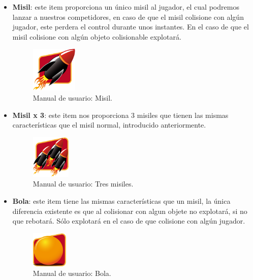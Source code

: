 \begin{itemize}
    \item \textbf{Misil}: este item proporciona un único misil al jugador, el cual podremos lanzar a nuestros competidores,
    en caso de que el misil colisione con algún jugador, este perdera el control durante unos instantes. En el caso de que el 
    misil colisione con algún objeto colisionable explotará.
        \begin{figure}[H]
          \label{misil}
          \begin{center}
            \includegraphics[scale=1]{imagenes/items/missile.png}
          \end{center}
         \caption{Manual de usuario: Misil.}
        \end{figure}
        
    \item \textbf{Misil x 3}: este item nos proporciona 3 misiles que tienen las mismas características que el misil normal, 
    introducido anteriormente.
        \begin{figure}[H]
          \label{tres_misiles}
          \begin{center}
            \includegraphics[scale=1]{imagenes/items/3missile.png}
          \end{center}
         \caption{Manual de usuario: Tres misiles.}
        \end{figure}
        
    \item \textbf{Bola}: este item tiene las mismas características que un misil, la única diferencia existente es que al 
    colisionar con algun objete no explotará, si no que rebotará. Sólo explotará en el caso de que colisione con algún
    jugador.        
        \begin{figure}[H]
          \label{bola}
          \begin{center}
            \includegraphics[scale=1]{imagenes/items/ball.png}
          \end{center}
         \caption{Manual de usuario: Bola.}
        \end{figure}
        

\end{itemize}
